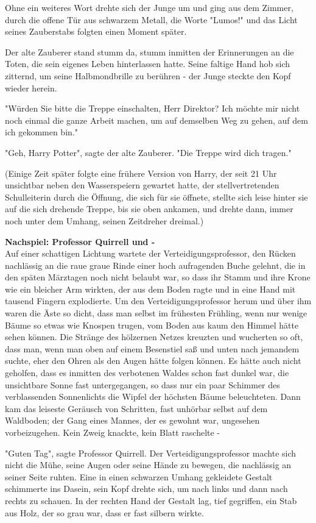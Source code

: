 {Ohne ein weiteres Wort drehte sich der Junge um und ging aus dem Zimmer, durch die offene Tür aus schwarzem Metall, die Worte "Lumos!" und das Licht seines Zauberstabs folgten einen Moment später.

Der alte Zauberer stand stumm da, stumm inmitten der Erinnerungen an die Toten, die sein eigenes Leben hinterlassen hatte. Seine faltige Hand hob sich zitternd, um seine Halbmondbrille zu berühren - der Junge steckte den Kopf wieder herein.

"Würden Sie bitte die Treppe einschalten, Herr Direktor? Ich möchte mir nicht noch einmal die ganze Arbeit machen, um auf demselben Weg zu gehen, auf dem ich gekommen bin."

"Geh, Harry Potter", sagte der alte Zauberer. "Die Treppe wird dich tragen."

(Einige Zeit später folgte eine frühere Version von Harry, der seit 21 Uhr unsichtbar neben den Wasserspeiern gewartet hatte, der stellvertretenden Schulleiterin durch die Öffnung, die sich für sie öffnete, stellte sich leise hinter sie auf die sich drehende Treppe, bis sie oben ankamen, und drehte dann, immer noch unter dem Umhang, seinen Zeitdreher dreimal.)

\textbf{Nachspiel: Professor Quirrell und -}\\ Auf einer schattigen Lichtung wartete der Verteidigungsprofessor, den Rücken nachlässig an die raue graue Rinde einer hoch aufragenden Buche gelehnt, die in den späten Märztagen noch nicht belaubt war, so dass ihr Stamm und ihre Krone wie ein bleicher Arm wirkten, der aus dem Boden ragte und in eine Hand mit tausend Fingern explodierte. Um den Verteidigungsprofessor herum und über ihm waren die Äste so dicht, dass man selbst im frühesten Frühling, wenn nur wenige Bäume so etwas wie Knospen trugen, vom Boden aus kaum den Himmel hätte sehen können. Die Stränge des hölzernen Netzes kreuzten und wucherten so oft, dass man, wenn man oben auf einem Besenstiel saß und unten nach jemandem suchte, eher den Ohren als den Augen hätte folgen können. Es hätte auch nicht geholfen, dass es inmitten des verbotenen Waldes schon fast dunkel war, die unsichtbare Sonne fast untergegangen, so dass nur ein paar Schimmer des verblassenden Sonnenlichts die Wipfel der höchsten Bäume beleuchteten. Dann kam das leiseste Geräusch von Schritten, fast unhörbar selbst auf dem Waldboden; der Gang eines Mannes, der es gewohnt war, ungesehen vorbeizugehen. Kein Zweig knackte, kein Blatt raschelte -

"Guten Tag", sagte Professor Quirrell. Der Verteidigungsprofessor machte sich nicht die Mühe, seine Augen oder seine Hände zu bewegen, die nachlässig an seiner Seite ruhten. Eine in einen schwarzen Umhang gekleidete Gestalt schimmerte ins Dasein, sein Kopf drehte sich, um nach links und dann nach rechts zu schauen. In der rechten Hand der Gestalt lag, tief gegriffen, ein Stab aus Holz, der so grau war, dass er fast silbern wirkte.

}
